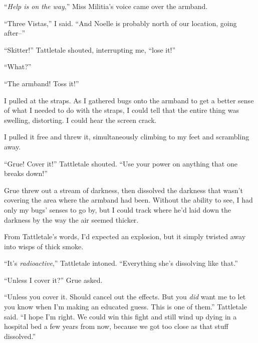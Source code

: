 





``\emph{Help is on the way},'' Miss Militia's voice came over the armband.



``Three Vistas,'' I said.  ``And Noelle is probably north of our location, going after--''



``Skitter!''  Tattletale shouted, interrupting me, ``lose it!''



``What?''



``The armband!  Toss it!''



I pulled at the straps.  As I gathered bugs onto the armband to get a better sense of what I needed to do with the straps, I could tell that the entire thing was swelling, distorting.  I could hear the screen crack.



I pulled it free and threw it, simultaneously climbing to my feet and scrambling away.



``Grue!  Cover it!''  Tattletale shouted.  ``Use your power on anything that one breaks down!''



Grue threw out a stream of darkness, then dissolved the darkness that wasn't covering the area where the armband had been.  Without the ability to see, I had only my bugs' senses to go by, but I could track where he'd laid down the darkness by the way the air seemed thicker.



From Tattletale's words, I'd expected an explosion, but it simply twisted away into wisps of thick smoke.



``It's \emph{radioactive},'' Tattletale intoned.  ``Everything she's dissolving like that.''



``Unless I cover it?'' Grue asked.



``Unless you cover it.  Should cancel out the effects.  But you \emph{did} want me to let you know when I'm making an educated guess.  This is one of them.'' Tattletale said.  ``I hope I'm right.  We could win this fight and still wind up dying in a hospital bed a few years from now, because we got too close as that stuff dissolved.''



